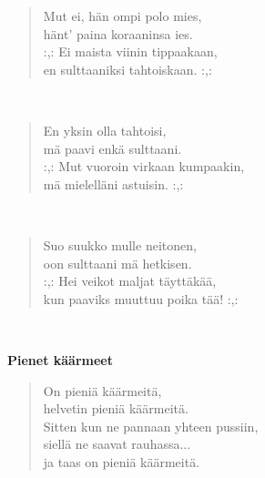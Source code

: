 \noindent\begin{minipage}{\linewidth}
\begin{verse}
	Mut ei, hän ompi polo mies,\\
	hänt' paina koraaninsa ies.\\
	\hspace{0pt-\widthof{:,: }}:,: Ei maista viinin tippaakaan,\\
	en sulttaaniksi tahtoiskaan. :,:\\
\end{verse}
\end{minipage}\\[10pt]
\noindent\begin{minipage}{\linewidth}
\begin{verse}
	En yksin olla tahtoisi,\\
	mä paavi enkä sulttaani.\\
	\hspace{0pt-\widthof{:,: }}:,: Mut vuoroin virkaan kumpaakin,\\
	mä mielelläni astuisin. :,:\\
\end{verse}
\end{minipage}\\[10pt]
\noindent\begin{minipage}{\linewidth}
\begin{verse}
	Suo suukko mulle neitonen,\\
	oon sulttaani mä hetkisen.\\
	\hspace{0pt-\widthof{:,: }}:,: Hei veikot maljat täyttäkää,\\
	kun paaviks muuttuu poika tää! :,:\\
\end{verse}
\end{minipage}\\[10pt]
%
%
\noindent\begin{minipage}{\linewidth}
\vspace{5pt}
\parbox[t]{0.85\linewidth}{\raggedright {\large\bf Pienet käärmeet}\\[6pt]}
\begin{verse}
	On pieniä käärmeitä,\\
	helvetin pieniä käärmeitä.\\
	Sitten kun ne pannaan yhteen pussiin,\\
	siellä ne saavat rauhassa...\\
	ja taas on pieniä käärmeitä.\\
\end{verse}
\end{minipage}\\[10pt]
